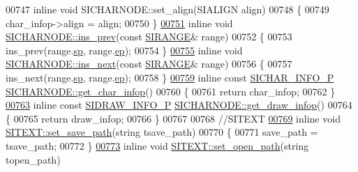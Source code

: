 \begin{DoxyCode}
00747 \textcolor{keyword}{inline} \textcolor{keywordtype}{void} SICHARNODE::set\_align(SIALIGN align)
00748 \{
00749     char\_infop->align = align;
00750 \}
\hyperlink{class_s_i_c_h_a_r_n_o_d_e_a85ebada9a5d765d7f055bab903b6c6d2}{00751} \textcolor{keyword}{inline} \textcolor{keywordtype}{void} \hyperlink{class_s_i_c_h_a_r_n_o_d_e_a0aba68c10438db18bea07bb77d70f839}{SICHARNODE::ins\_prev}(\textcolor{keyword}{const} \hyperlink{struct_s_i_r_a_n_g_e}{SIRANGE}& range)
00752 \{
00753     ins\_prev(range.\hyperlink{struct_s_i_r_a_n_g_e_a7acdf296d873d6ed6fc203674109b715}{sp}, range.\hyperlink{struct_s_i_r_a_n_g_e_aaa89b5ae16be7b890eba048bc212feec}{ep});
00754 \}
\hyperlink{class_s_i_c_h_a_r_n_o_d_e_af8048308dc6b0ffdf02caceb814ee8e3}{00755} \textcolor{keyword}{inline} \textcolor{keywordtype}{void} \hyperlink{class_s_i_c_h_a_r_n_o_d_e_a9a3f1b6c50c483ad2d8a770f4590c50c}{SICHARNODE::ins\_next}(\textcolor{keyword}{const} \hyperlink{struct_s_i_r_a_n_g_e}{SIRANGE}& range)
00756 \{
00757     ins\_next(range.\hyperlink{struct_s_i_r_a_n_g_e_a7acdf296d873d6ed6fc203674109b715}{sp}, range.\hyperlink{struct_s_i_r_a_n_g_e_aaa89b5ae16be7b890eba048bc212feec}{ep});
00758 \}
\hyperlink{class_s_i_c_h_a_r_n_o_d_e_a95039205cd53a18d6f1b8ef1a80c90c2}{00759} \textcolor{keyword}{inline} \textcolor{keyword}{const} \hyperlink{class_s_i_c_h_a_r___i_n_f_o}{SICHAR\_INFO\_P} \hyperlink{class_s_i_c_h_a_r_n_o_d_e_a95039205cd53a18d6f1b8ef1a80c90c2}{SICHARNODE::get\_char\_infop}()
00760 \{
00761     \textcolor{keywordflow}{return} char\_infop;
00762 \}
\hyperlink{class_s_i_c_h_a_r_n_o_d_e_a96a8903f87343bb9096a8ed014e789be}{00763} \textcolor{keyword}{inline} \textcolor{keyword}{const} \hyperlink{class_s_i_d_r_a_w___i_n_f_o}{SIDRAW\_INFO\_P} \hyperlink{class_s_i_c_h_a_r_n_o_d_e_a96a8903f87343bb9096a8ed014e789be}{SICHARNODE::get\_draw\_infop}()
00764 \{
00765     \textcolor{keywordflow}{return} draw\_infop;
00766 \}
00767 
00768 \textcolor{comment}{//SITEXT}
\hyperlink{class_s_i_t_e_x_t_a150118dc911f012d521f64a54fbc05f5}{00769} \textcolor{keyword}{inline} \textcolor{keywordtype}{void} \hyperlink{class_s_i_t_e_x_t_a150118dc911f012d521f64a54fbc05f5}{SITEXT::set\_save\_path}(\textcolor{keywordtype}{string} tsave\_path)
00770 \{
00771     save\_path = tsave\_path;
00772 \}
\hyperlink{class_s_i_t_e_x_t_aaf81d56b98488470fb9b7eba1f570d8e}{00773} \textcolor{keyword}{inline} \textcolor{keywordtype}{void} \hyperlink{class_s_i_t_e_x_t_aaf81d56b98488470fb9b7eba1f570d8e}{SITEXT::set\_open\_path}(\textcolor{keywordtype}{string} topen\_path)

\end{DoxyCode}
